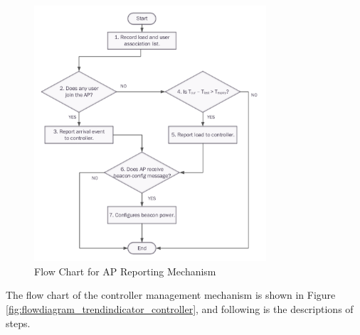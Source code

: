 \begin{figure}[tbp]
\centering
\includegraphics[width=3.4in]{images/flowdiagram_trendindicator_ap.pdf}
\caption{Flow Chart for AP Reporting Mechanism}
\label{fig:flowdiagram_trendindicator_ap}
\end{figure}

The flow chart of the controller management mechanism is shown in Figure \ref{fig:flowdiagram_trendindicator_controller}, and following is the descriptions of steps.

